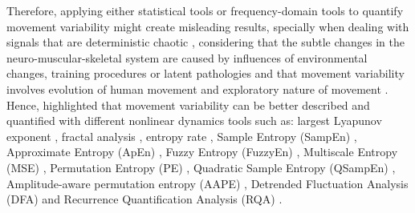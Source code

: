 Therefore, applying either statistical tools or frequency-domain tools 
to quantify movement variability might create misleading results, 
specially when dealing with signals that are deterministic chaotic 
\citep{amato1992, dingwell2000, dingwell2007, miller2006},
considering  
that the subtle changes in the neuro-muscular-skeletal system are caused by 
influences of environmental changes, training procedures or latent 
pathologies \citep{preatoni2010, preatoni2013}
and that movement variability involves evolution of human movement and 
exploratory nature of movement \citep{stergiou2011, caballero2014}. 
Hence, \cite{stergiou2011, preatoni2010, caballero2014} 
highlighted that movement variability can be better described and quantified 
with different nonlinear dynamics tools such as: 
largest Lyapunov exponent \citep{bruijn2009, donker2007, kurz2010b, 
yang2011},
fractal analysis \citep{delignleres2003},
entropy rate \citep{cavanaugh2010},
Sample Entropy (SampEn)  \citep{richman2000, donker2007, liao2008, 
stins2009, vaillancourt2004},
Approximate Entropy (ApEn) \citep{pincus1991, kurz2010a, sosnoff2006, 
sosnoff2009, cavanaugh2010},
Fuzzy Entropy (FuzzyEn) \citep{chen2007},
Multiscale Entropy (MSE) \citep{costa2002},
Permutation Entropy (PE) \citep{bandt2002, vakharia2015},
Quadratic Sample Entropy (QSampEn) \citep{lake2011},
Amplitude-aware permutation entropy (AAPE) \citep{azami2016},
Detrended Fluctuation Analysis (DFA) \citep{gates2007, gates2008, 
hausdorff200} and 
Recurrence Quantification Analysis (RQA) \citep{zbilut1992, trulla1996, 
marwan2008}.


